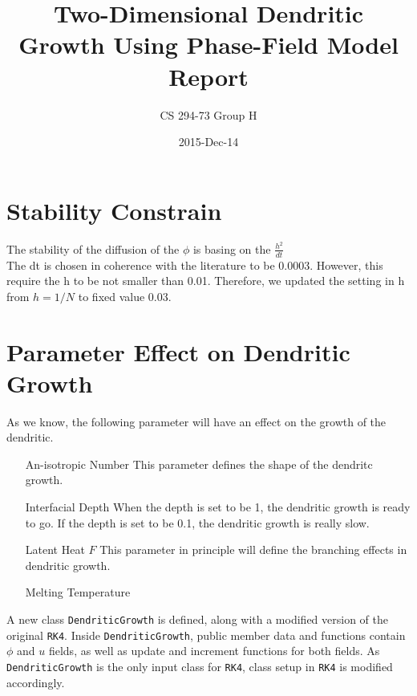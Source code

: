 \documentclass{article}
\title{Two-Dimensional Dendritic Growth Using Phase-Field Model \\ Report}
\date{2015-Dec-14}
\author{CS 294-73 Group H}
\begin{document}
\maketitle
    
\section{Stability Constrain}
The stability of the diffusion of the $\phi$ is basing on the $\frac{h^2}{dt}$
\\
The dt is chosen in coherence with the literature to be 0.0003. However, this require the h to be not smaller than 0.01. Therefore, we updated the setting in h from  $h=1/N$ to fixed value 0.03. 


\section{Parameter Effect on Dendritic Growth}
As we know, the following parameter will have an effect on the growth of the dendritic. 
\begin{enumerate}

\item[An-isotropic Number]
This parameter defines the shape of the dendritc growth.
\item[Interfacial Depth]
When the depth is set to be 1, the dendritic growth is ready to go.
If the depth is set to be 0.1, the dendritic growth is really slow.

\item[Latent Heat $F$]
This parameter in principle will define the branching effects in dendritic growth.
\item[Melting Temperature]
\end{enumerate}
A new class \texttt{DendriticGrowth} is defined, along with a modified version of the original \texttt{RK4}. Inside \texttt{DendriticGrowth}, public member data and functions contain $\phi$ and $u$ fields, as well as update and increment functions for both fields. As \texttt{DendriticGrowth} is the only input class for \texttt{RK4}, class setup in \texttt{RK4} is modified accordingly. 
\end{document}
